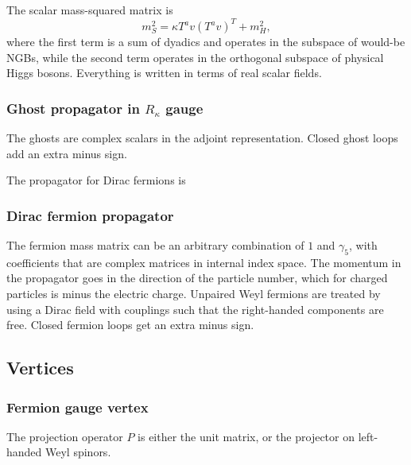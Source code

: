 The scalar mass-squared matrix is
\begin{equation*}
  m_S^2=\kappa T^a v(T^a v)^T+m_H^2,
\end{equation*}
where the first term is a sum of dyadics and operates in the subspace of
would-be NGBs, while the second term operates in the orthogonal subspace of
physical Higgs bosons. Everything is written in terms of real scalar fields.

\BanksDGhostPropagator

\subsubsection{Ghost propagator in $R_\kappa$ gauge}

The ghosts are complex scalars in the adjoint representation. Closed ghost loops
add an extra minus sign.

The propagator for Dirac fermions is

\BanksDFermionPropagator

\subsubsection{Dirac fermion propagator}

The fermion mass matrix can be an arbitrary combination of \(1\) and \(\gamma_5\),
with coefficients that are complex matrices in internal index space. The momentum
in the propagator goes in the direction of the particle number, which for charged
particles is minus the electric charge. Unpaired Weyl fermions are treated by using
a Dirac field with couplings such that the right-handed components are free. Closed
fermion loops get an extra minus sign.

\subsection{Vertices}

\BanksDFermionGaugeVertex

\subsubsection{Fermion gauge vertex}

The projection operator \(P\) is either the unit matrix, or the projector on
left-handed Weyl spinors.

\BanksDThreeGaugeVertex

